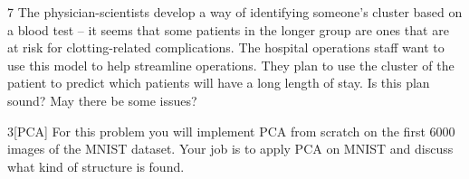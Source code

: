 \documentclass[expanded]{lkx_pset}
\begin{document}
\begin{parts}
	\begin{part}{7} The physician-scientists develop a way of identifying someone's
		cluster based on a blood test -- it seems that some patients in the
		longer group are ones that are at risk for clotting-related
		complications.  The hospital operations staff want to use this model
		to help streamline operations.  They plan to use the cluster of the
		patient to predict which patients will have a long length of stay.
		Is this plan sound?  May there be some issues?
	\end{part}

\end{parts}

\begin{problem}{3}[PCA]
For this problem you will implement PCA from scratch on the first 6000 images of the MNIST dataset. Your job is to apply PCA on MNIST and discuss what kind of structure is found.
\end{problem}
\end{document}
